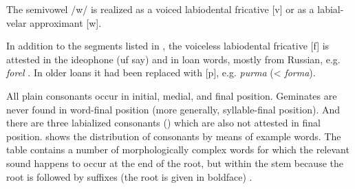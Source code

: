 The semivowel /w/ is realized as a voiced labiodental fricative [v] or as a labial-velar approximant [w]. 

In addition to the segments listed in , the voiceless labiodental fricative [f] is attested in the ideophone   (uf say) and in loan words, mostly from Russian, e.g. \textit{forel} . In older loans it had been replaced with [p], e.g. \textit{purma}  (< \textit{forma}).

All plain consonants occur in initial, medial, and final position. Geminates are never found in word-final position (more generally, syllable-final position). And there are three labialized consonants () which are also not attested in final position.  shows the distribution of consonants by means of example words. The table contains a number of morphologically complex words for which the relevant sound happens to occur at the end of the root, but within the stem because the root is followed by suffixes (the root is given in boldface) . 
%

